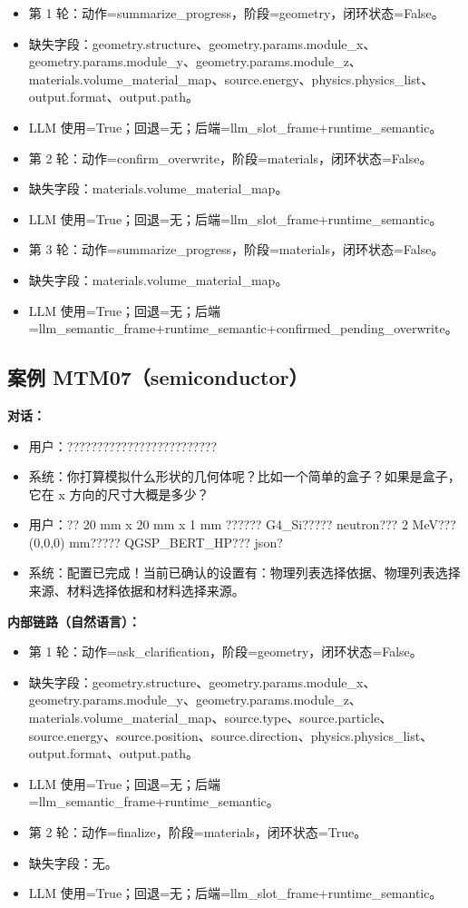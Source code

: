 \documentclass[11pt]{ctexart}
\begin{document}
\begin{itemize}
\item 第 1 轮：动作=summarize\_progress，阶段=geometry，闭环状态=False。
\item 缺失字段：geometry.structure、geometry.params.module\_x、geometry.params.module\_y、geometry.params.module\_z、materials.volume\_material\_map、source.energy、physics.physics\_list、output.format、output.path。
\item LLM 使用=True；回退=无；后端=llm\_slot\_frame+runtime\_semantic。
\item 第 2 轮：动作=confirm\_overwrite，阶段=materials，闭环状态=False。
\item 缺失字段：materials.volume\_material\_map。
\item LLM 使用=True；回退=无；后端=llm\_slot\_frame+runtime\_semantic。
\item 第 3 轮：动作=summarize\_progress，阶段=materials，闭环状态=False。
\item 缺失字段：materials.volume\_material\_map。
\item LLM 使用=True；回退=无；后端=llm\_semantic\_frame+runtime\_semantic+confirmed\_pending\_overwrite。
\end{itemize}
\subsection{案例 MTM07（semiconductor）}
\textbf{对话：}
\begin{itemize}
\item 用户：?????????????????????????
\item 系统：你打算模拟什么形状的几何体呢？比如一个简单的盒子？如果是盒子，它在 x 方向的尺寸大概是多少？
\item 用户：?? 20 mm x 20 mm x 1 mm ?????? G4\_Si????? neutron??? 2 MeV??? (0,0,0) mm????? QGSP\_BERT\_HP??? json?
\item 系统：配置已完成！当前已确认的设置有：物理列表选择依据、物理列表选择来源、材料选择依据和材料选择来源。
\end{itemize}
\textbf{内部链路（自然语言）：}
\begin{itemize}
\item 第 1 轮：动作=ask\_clarification，阶段=geometry，闭环状态=False。
\item 缺失字段：geometry.structure、geometry.params.module\_x、geometry.params.module\_y、geometry.params.module\_z、materials.volume\_material\_map、source.type、source.particle、source.energy、source.position、source.direction、physics.physics\_list、output.format、output.path。
\item LLM 使用=True；回退=无；后端=llm\_semantic\_frame+runtime\_semantic。
\item 第 2 轮：动作=finalize，阶段=materials，闭环状态=True。
\item 缺失字段：无。
\item LLM 使用=True；回退=无；后端=llm\_slot\_frame+runtime\_semantic。
\end{itemize}
\end{document}
